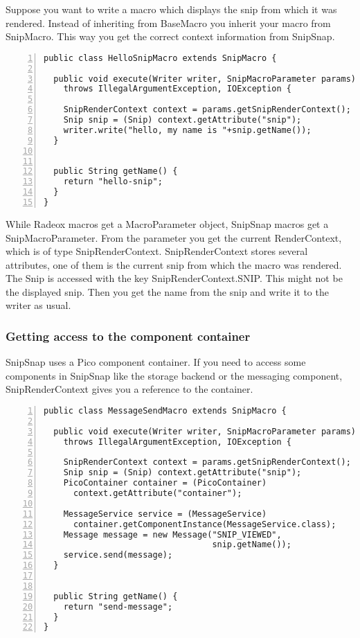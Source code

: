 \documentclass[a4paper,pdftex]{article}
\begin{document}
Suppose you want to write a macro which displays the snip from which it was rendered.
Instead of inheriting from BaseMacro you inherit your macro from SnipMacro. This
way you get the correct context information from SnipSnap.

\begin{Verbatim}[gobble=0,frame=single,numbers=left,fontsize=\small]
public class HelloSnipMacro extends SnipMacro {

  public void execute(Writer writer, SnipMacroParameter params)
    throws IllegalArgumentException, IOException {

    SnipRenderContext context = params.getSnipRenderContext();
    Snip snip = (Snip) context.getAttribute("snip");
    writer.write("hello, my name is "+snip.getName());
  }


  public String getName() {
    return "hello-snip";
  }
}
\end{Verbatim}

While Radeox macros get a MacroParameter object, SnipSnap macros get a SnipMacroParameter. From the parameter
you get the current RenderContext, which is of type SnipRenderContext. SnipRenderContext stores several attributes,
one of them is the current snip from which the macro was rendered. The Snip is accessed with the key SnipRenderContext.SNIP.
This might not be the displayed snip. Then you get the name from the snip and write it to the writer as usual.

\subsubsection{Getting access to the component container}

SnipSnap uses a Pico component container\cite{PicoContainer}. If you need
to access some components in SnipSnap like the storage backend or the messaging
component, SnipRenderContext gives you a reference to the container.

\begin{Verbatim}[gobble=0,frame=single,numbers=left,fontsize=\small]
public class MessageSendMacro extends SnipMacro {

  public void execute(Writer writer, SnipMacroParameter params)
    throws IllegalArgumentException, IOException {

    SnipRenderContext context = params.getSnipRenderContext();
    Snip snip = (Snip) context.getAttribute("snip");
    PicoContainer container = (PicoContainer)
      context.getAttribute("container");

    MessageService service = (MessageService)
      container.getComponentInstance(MessageService.class);
    Message message = new Message("SNIP_VIEWED",
                                  snip.getName());
    service.send(message);
  }


  public String getName() {
    return "send-message";
  }
}
\end{Verbatim}
\end{document}
